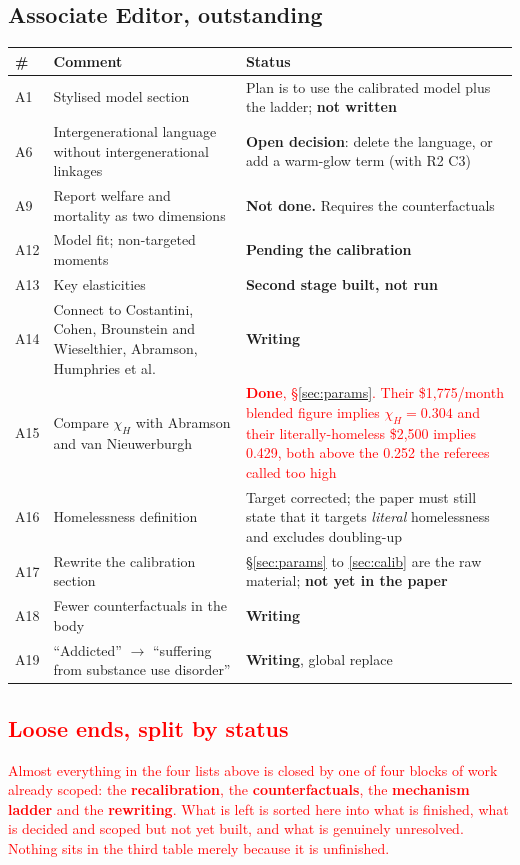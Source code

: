 \documentclass[11pt]{article}
\newcommand{\nw}[1]{\textcolor{red}{#1}}
\begin{document}
\subsection{Associate Editor, outstanding}

\begin{longtable}{lL{7.4cm}L{4.6cm}}
\toprule
\# & Comment & Status\\
\midrule
\endhead
A1 & Stylised model section & Plan is to use the calibrated model plus the ladder; \textbf{not written}\\
A6 & Intergenerational language without intergenerational linkages & \textbf{Open decision}: delete the language, or add a warm-glow term (with R2 C3)\\
A9 & Report welfare and mortality as two dimensions & \textbf{Not done.} Requires the counterfactuals\\
A12 & Model fit; non-targeted moments & \textbf{Pending the calibration}\\
A13 & Key elasticities & \textbf{Second stage built, not run}\\
A14 & Connect to Costantini, Cohen, Brounstein and Wieselthier, Abramson, Humphries et al. & \textbf{Writing}\\
A15 & Compare $\chi_H$ with Abramson and van Nieuwerburgh & \nw{\textbf{Done}, \S\ref{sec:params}. Their \$1{,}775/month blended figure implies $\chi_H=0.304$ and their literally-homeless \$2{,}500 implies 0.429, both above the 0.252 the referees called too high}\\
A16 & Homelessness definition & Target corrected; the paper must still state that it targets \emph{literal} homelessness and excludes doubling-up\\
A17 & Rewrite the calibration section & \S\ref{sec:params} to \ref{sec:calib} are the raw material; \textbf{not yet in the paper}\\
A18 & Fewer counterfactuals in the body & \textbf{Writing}\\
A19 & ``Addicted'' $\rightarrow$ ``suffering from substance use disorder'' & \textbf{Writing}, global replace\\
\bottomrule
\end{longtable}

\subsection{\nw{Loose ends, split by status}}

\nw{Almost everything in the four lists above is closed by one of four blocks of
work already scoped: the \textbf{recalibration}, the \textbf{counterfactuals},
the \textbf{mechanism ladder} and the \textbf{rewriting}. What is left is sorted
here into what is finished, what is decided and scoped but not yet built, and
what is genuinely unresolved. Nothing sits in the third table merely because it
is unfinished.}
\end{document}
